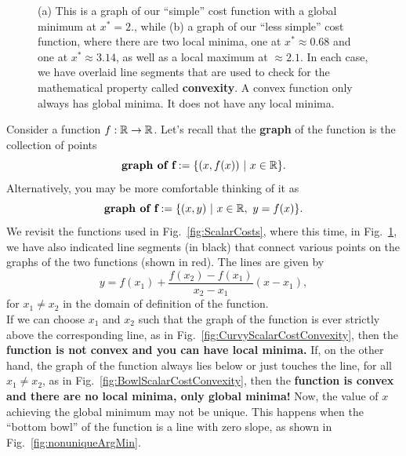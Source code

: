 \begin{figure}[thb]%
\centering
{}%
\hspace{5pt}%
%
\caption[]{(a) This is a graph of our ``simple'' cost function with a global minimum at $x^\ast=2$., while (b) a graph of our ``less simple'' cost function, where there are two local minima, one at $x^\ast\approx 0.68$ and one at $x^\ast\approx 3.14$, as well as a local maximum at $\approx 2.1$. In each case, we have overlaid line segments that are used to check for the mathematical property called \textbf{convexity}. A convex function only always has global minima. It does not have any local minima.}
    \label{fig:ScalarCostsConvexity}
\end{figure}


Consider a function $f: \mathbb R \to \mathbb R$. Let's recall that the \textbf{graph} of the function is the collection of points 
$$\textbf{graph of f}:=\{ (x, f(x))~|~ x \in \mathbb R \}. $$
Alternatively, you may be more comfortable thinking of it as 
$$\textbf{graph of f}:=\{ (x, y)~|~ x \in \mathbb R,~y=f(x) \}. $$
We revisit the functions used in Fig.~\ref{fig:ScalarCosts}, where this time, in Fig.~\ref{fig:ScalarCostsConvexity}, we have also indicated line segments (in black) that connect various points on the graphs of the two functions (shown in red). The lines are given by \begin{equation}
\label{eq:Line4Convexity}
y = f(x_1) + \frac{f(x_2)-f(x_1)}{x_2-x_1}(x-x_1),
\end{equation}
for $x_1\neq x_2$ in the domain of definition of the function.\\

If we can choose $x_1$ and $x_2$ such that the graph of the function is ever strictly above the corresponding line, as in Fig.~\ref{fig:CurvyScalarCostConvexity}, then the \textbf{function is not convex and you can have local minima.} If, on the other hand, the graph of the function always lies below or just touches the line, for all $x_1 \neq x_2$, as in Fig.~\ref{fig:BowlScalarCostConvexity}, then the \textbf{function is convex and there are no local minima, only global minima!} Now, the value of $x$ achieving the global minimum may not be unique. This happens when the ``bottom bowl'' of the function is a line with zero slope, as shown in Fig.~\ref{fig:nonuniqueArgMin}. 
 
